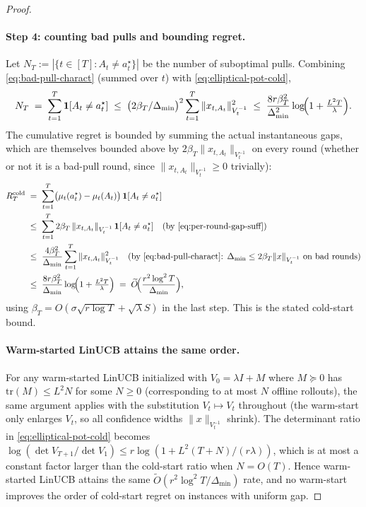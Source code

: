 \documentclass{article}
\theoremstyle{definition}
\theoremstyle{remark}
\theoremstyle{remark}
\begin{document}
\begin{proof}
\paragraph{Step 4: counting bad pulls and bounding regret.}
Let $N_T := |\{t\in[T] : A_t\ne a_t^\star\}|$ be the number of
suboptimal pulls. Combining \eqref{eq:bad-pull-charact} (summed over
$t$) with \eqref{eq:elliptical-pot-cold},
\[
N_T
\;=\;\sum_{t=1}^T \mathbf 1[A_t\ne a_t^\star]
\;\le\; \bigl(2\beta_T/\Delta_{\min}\bigr)^2 \sum_{t=1}^T\|x_{t,A_t}\|_{V_t^{-1}}^2
\;\le\; \frac{8 r \beta_T^2}{\Delta_{\min}^2}\log\!\Bigl(1+\tfrac{L^2 T}{\lambda}\Bigr).
\]
The cumulative regret is bounded by summing the actual instantaneous
gaps, which are themselves bounded above by $2\beta_T\|x_{t,A_t}\|_{V_t^{-1}}$
on every round (whether or not it is a bad-pull round, since
$\|x_{t,A_t}\|_{V_t^{-1}}\ge 0$ trivially):
\begin{align*}
R_T^{\mathrm{cold}}
\;&=\;\sum_{t=1}^T \bigl(\mu_t(a_t^\star)-\mu_t(A_t)\bigr)\,\mathbf 1[A_t\ne a_t^\star] \\
\;&\le\;\sum_{t=1}^T 2\beta_T\,\|x_{t,A_t}\|_{V_t^{-1}}\,\mathbf 1[A_t\ne a_t^\star]
\quad\text{(by \eqref{eq:per-round-gap-suff})} \\
\;&\le\;\frac{4\beta_T^2}{\Delta_{\min}}\sum_{t=1}^T\|x_{t,A_t}\|_{V_t^{-1}}^2
\quad\text{(by \eqref{eq:bad-pull-charact}: $\Delta_{\min}\le 2\beta_T\|x\|_{V_t^{-1}}$ on bad rounds)}\\
\;&\le\;\frac{8 r \beta_T^2}{\Delta_{\min}}\log\!\Bigl(1+\tfrac{L^2 T}{\lambda}\Bigr)
\;=\; \widetilde O\!\Bigl(\frac{r^2\log^2 T}{\Delta_{\min}}\Bigr),
\end{align*}
using $\beta_T = O(\sigma\sqrt{r\log T}+\sqrt\lambda S)$ in the last
step. This is the stated cold-start bound.

\paragraph{Warm-started LinUCB attains the same order.}
For any warm-started LinUCB initialized with $V_0=\lambda I + M$ where
$M\succeq 0$ has $\mathrm{tr}(M)\le L^2 N$ for some
$N\ge 0$ (corresponding to at most $N$ offline rollouts), the same
argument applies with the substitution $V_t \mapsto V_t$ throughout
(the warm-start only enlarges $V_t$, so all confidence widths
$\|x\|_{V_t^{-1}}$ shrink). The determinant ratio in
\eqref{eq:elliptical-pot-cold} becomes
$\log(\det V_{T+1}/\det V_1) \le r\log(1+L^2(T+N)/(r\lambda))$,
which is at most a constant factor larger than the cold-start ratio
when $N=O(T)$. Hence warm-started LinUCB attains the same
$\widetilde O(r^2\log^2 T/\Delta_{\min})$ rate, and no warm-start
improves the order of cold-start regret on instances with uniform gap.
\end{proof}
\end{document}
